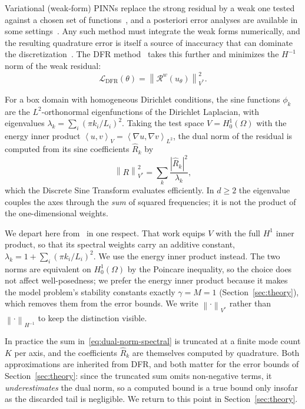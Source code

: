 \documentclass[preprint,11pt]{elsarticle}
\newcommand{\norm}[1]{\left\|#1\right\|}
\newcommand{\inner}[2]{\left\langle #1, #2 \right\rangle}
\begin{document}
Variational (weak-form) PINNs replace the strong residual by a weak one tested against a chosen set of functions~\citep{kharazmi2021hpvpinns}, and a posteriori error analyses are available in some settings~\citep{berrone2022solving}. Any such method must integrate the weak forms numerically, and the resulting quadrature error is itself a source of inaccuracy that can dominate the discretization~\citep{rivera2022quadrature}. The DFR method~\citep{taylor2023deep} takes this further and minimizes the $H^{-1}$ norm of the weak residual:
\begin{equation}
    \mathcal{L}_{\text{DFR}}(\theta) = \norm{\mathcal{R}^w(u_\theta)}_{V^*}^2.
\end{equation}

For a box domain with homogeneous Dirichlet conditions, the sine functions $\phi_k$ are the $L^2$-orthonormal eigenfunctions of the Dirichlet Laplacian, with eigenvalues $\lambda_k = \sum_i (\pi k_i / L_i)^2$. Taking the test space $V = H^1_0(\Omega)$ with the energy inner product $\inner{u}{v}_V = \inner{\nabla u}{\nabla v}_{L^2}$, the dual norm of the residual is computed from its sine coefficients $\hat{R}_k$ by
\begin{equation}
    \label{eq:dual-norm-spectral}
    \norm{R}_{V^*}^2 = \sum_{k} \frac{|\hat{R}_k|^2}{\lambda_k},
\end{equation}
which the Discrete Sine Transform evaluates efficiently. In $d \ge 2$ the eigenvalue couples the axes through the \emph{sum} of squared frequencies; it is not the product of the one-dimensional weights.

We depart here from~\citep{taylor2023deep} in one respect. That work equips $V$ with the full $H^1$ inner product, so that its spectral weights carry an additive constant, $\lambda_k = 1 + \sum_i (\pi k_i / L_i)^2$. We use the energy inner product instead. The two norms are equivalent on $H^1_0(\Omega)$ by the Poincare inequality, so the choice does not affect well-posedness; we prefer the energy inner product because it makes the model problem's stability constants exactly $\gamma = M = 1$ (Section~\ref{sec:theory}), which removes them from the error bounds. We write $\norm{\cdot}_{V^*}$ rather than $\norm{\cdot}_{H^{-1}}$ to keep the distinction visible.

In practice the sum in~\eqref{eq:dual-norm-spectral} is truncated at a finite mode count $K$ per axis, and the coefficients $\hat{R}_k$ are themselves computed by quadrature. Both approximations are inherited from DFR, and both matter for the error bounds of Section~\ref{sec:theory}: since the truncated sum omits non-negative terms, it \emph{underestimates} the dual norm, so a computed bound is a true bound only insofar as the discarded tail is negligible. We return to this point in Section~\ref{sec:theory}.
\end{document}
